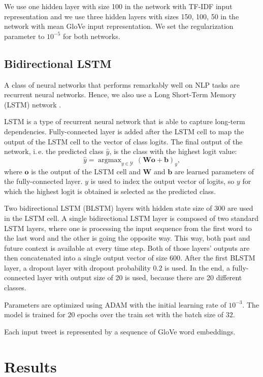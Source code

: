 \documentclass[10pt, a4paper]{article}
\DeclareMathOperator*{\argmax}{argmax}
\begin{document}
We use one hidden layer with size 100 in the network with TF-IDF input 
representation and we use three hidden layers with sizes 150, 100, 50 in the 
network with mean GloVe input representation. We set the regularization 
parameter to $10^{-5}$ for both networks.

\subsection{Bidirectional LSTM}

A class of neural networks that performs remarkably well on NLP tasks are 
recurrent neural networks. Hence, we also use a Long Short-Term Memory (LSTM) 
network \citep{hochreiter1997long}.

LSTM is a type of recurrent neural network that is able to capture long-term 
dependencies. Fully-connected layer is added after the LSTM cell to map the 
output of the LSTM cell to the vector of class logits. The final output of the 
network, i.\,e. the predicted class $\hat{y}$, is the class with the highest 
logit value:
$$\hat{y} = \argmax_{y \in \mathcal{Y}} 
    \,(\mathbf{W} \mathbf{o} + \mathbf{b})_y,$$
where $\mathbf{o}$ is the output of the LSTM cell and $\mathbf{W}$ and 
$\mathbf{b}$ are learned parameters of the fully-connected layer. $y$ is used to
index the output vector of logits, so $y$ for which the highest logit is 
obtained is selected as the predicted class.

Two bidirectional LSTM (BLSTM) layers with hidden state size of 300 are used in 
the LSTM cell. A single bidirectional LSTM layer is composed of two standard 
LSTM layers, where one is processing the input sequence from the first word to 
the last word and the other is going the opposite way. This way, both past and 
future context is available at every time step. Both of those layers' outputs 
are then concatenated into a single output vector of size 600. After the first 
BLSTM layer, a dropout layer with dropout probability $0.2$ is used. In the end,
a fully-connected layer with output size of 20 is used, because there are 20 
different classes.

Parameters are optimized using ADAM \citep{kingma2014adam} with the initial 
learning rate of $10^{-3}$. The model is trained for $20$ epochs over the train 
set with the batch size of $32$.

Each input tweet is represented by a sequence of GloVe word embeddings.

\section{Results}
\end{document}

